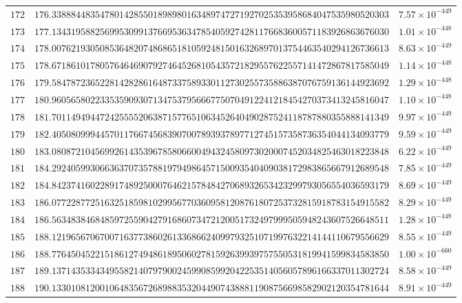 \documentclass[12pt,reqno]{amsart}
\theoremstyle{remark}
\begin{document}
\begin{longtable}{clc}
$172$ & $176.3388844835478014285501898980163489747271927025353958684047535980520303$ & $7.57\times 10^{-449}$ \\
$173$ & $177.1343195882569953099137669536347854059274281176683600571183926863676030$ & $1.01\times 10^{-448}$ \\
$174$ & $178.0076219305085364820748686518105924815016326897013754463540294126736613$ & $8.63\times 10^{-449}$ \\
$175$ & $178.6718610178057646469079274645268105435721829557622557141472867817585049$ & $1.14\times 10^{-448}$ \\
$176$ & $179.5847872365228142828616487337589330112730255735886387076759136144923692$ & $1.29\times 10^{-448}$ \\
$177$ & $180.9605658022335359093071347537956667750704912241218454270373413245816047$ & $1.10\times 10^{-448}$ \\
$178$ & $181.7011494944724255552063871577651063452640490287524118787880355888141349$ & $9.97\times 10^{-449}$ \\
$179$ & $182.4050809994457011766745683907007893937897712745157358736354044134093779$ & $9.59\times 10^{-449}$ \\
$180$ & $183.0808721045699261435396785806600494324580973020007452034825463018223848$ & $6.22\times 10^{-449}$ \\
$181$ & $184.2924059930663637073578819794986457150093540409038172983865667912689548$ & $7.85\times 10^{-449}$ \\
$182$ & $184.8423741602289174892500076462157848427068932653423299793056554036593179$ & $8.69\times 10^{-449}$ \\
$183$ & $186.0772287725163251859810299567703609581208761807253732815918783154915582$ & $8.29\times 10^{-449}$ \\
$184$ & $186.5634838468485972559042791686073472120051732497999505948243607526648511$ & $1.28\times 10^{-448}$ \\
$185$ & $188.1219656706700716377386026133686624099793251071997632214144110679556629$ & $8.55\times 10^{-449}$ \\
$186$ & $188.7764504522151861274948618950602781592639939757550531819941599834583850$ & $1.00\times 10^{-660}$ \\
$187$ & $189.1371435334349558214079790024599085992042253514056057896166337011302724$ & $8.58\times 10^{-449}$ \\
$188$ & $190.1330108120010648356726898835320449074388811908756698582902120354781644$ & $8.91\times 10^{-449}$ \\

\end{longtable}
\end{document}
